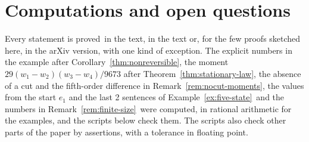 \section{Computations and open questions}\label{sec:verify}

Every statement is proved\ifarxivbuild\ in the text\else, in the text or, for the few proofs
sketched here, in the arXiv version\fi, with one kind of exception. The explicit numbers in the
example after Corollary~\ref{thm:nonreversible}, the moment $29(w_1-w_2)(w_3-w_4)/9673$ after
Theorem~\ref{thm:stationary-law}, the absence of a cut and the fifth-order difference in
Remark~\ref{rem:nocut-moments}, the values from the start $e_1$ and the last 2 sentences of
Example~\ref{ex:five-state}\ifarxivbuild\ and the numbers in Remark~\ref{rem:finite-size}\fi\ were
computed, in rational arithmetic for the
examples, and the scripts below check them. The scripts also check other parts of the paper by assertions, with a
tolerance in floating point.

